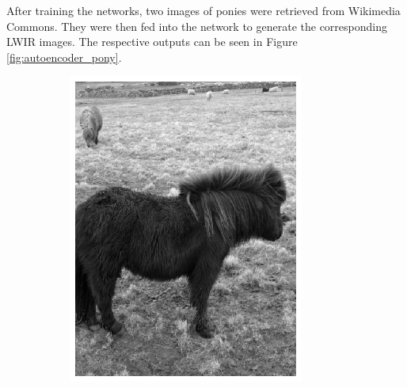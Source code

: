 \documentclass{l4proj}
\begin{document}
After training the networks, two images of ponies were retrieved from Wikimedia Commons. They were then fed into the network to generate the corresponding LWIR images. The respective outputs can be seen in Figure \ref{fig:autoencoder_pony}.

\begin{figure}[ht]
  \centering
  \begin{subfigure}[h!]{0.22\textwidth}
    \includegraphics[width=\textwidth, trim={0cm, 1cm, 0cm, 1cm}, clip]{images/autoencoder/pony_1/gray.png}


\end{subfigure}
\end{figure}
\end{document}
